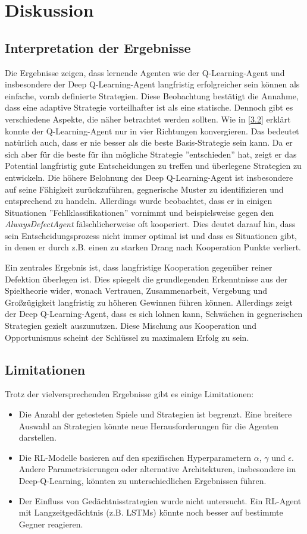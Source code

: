 \chapter{Diskussion}
\section{Interpretation der Ergebnisse}
Die Ergebnisse zeigen, dass lernende Agenten wie der Q-Learning-Agent und insbesondere der Deep Q-Learning-Agent 
langfristig erfolgreicher sein können als einfache, vorab definierte Strategien. Diese Beobachtung bestätigt die Annahme, dass 
eine adaptive Strategie vorteilhafter ist als eine statische. Dennoch gibt es verschiedene Aspekte, die näher betrachtet werden sollten.
Wie in \ref{3.2} erklärt konnte der Q-Learning-Agent nur in vier Richtungen konvergieren. Das bedeutet natürlich auch, dass er nie 
besser als die beste Basis-Strategie sein kann. Da er sich aber für die beste für ihn mögliche Strategie ''entschieden'' hat, zeigt 
er das Potential langfristig gute Entscheidungen zu treffen und überlegene Strategien zu entwickeln.
Die höhere Belohnung des Deep Q-Learning-Agent ist insbesondere auf seine Fähigkeit zurückzuführen, gegnerische Muster 
zu identifizieren und entsprechend zu handeln. Allerdings wurde beobachtet, dass er in einigen Situationen ''Fehlklassifikationen''  
vornimmt und beispielsweise gegen den \textit{AlwaysDefectAgent} fälschlicherweise oft kooperiert. Dies deutet darauf hin,  
dass sein Entscheidungsprozess nicht immer optimal ist und dass es Situationen gibt, in denen er durch z.B. einen zu starken Drang nach Kooperation 
Punkte verliert.

Ein zentrales Ergebnis ist, dass langfristige Kooperation gegenüber reiner Defektion überlegen ist. Dies spiegelt die grundlegenden 
Erkenntnisse aus der Spieltheorie wider, wonach Vertrauen, Zusammenarbeit, Vergebung und Großzügigkeit langfristig zu höheren Gewinnen führen können. 
Allerdings zeigt der Deep Q-Learning-Agent, dass es sich lohnen kann, Schwächen in gegnerischen Strategien gezielt auszunutzen. 
Diese Mischung aus Kooperation und Opportunismus scheint der Schlüssel zu maximalem Erfolg zu sein.

\section{Limitationen}
Trotz der vielversprechenden Ergebnisse gibt es einige Limitationen:
\begin{itemize}
    \item Die Anzahl der getesteten Spiele und Strategien ist begrenzt. Eine breitere Auswahl an Strategien könnte neue Herausforderungen für die Agenten darstellen.
    \item Die RL-Modelle basieren auf den spezifischen Hyperparametern $\alpha$, $\gamma$ und $\epsilon$. Andere Parametrisierungen oder alternative Architekturen, insbesondere im Deep-Q-Learning, könnten zu unterschiedlichen Ergebnissen führen.
    \item Der Einfluss von Gedächtnisstrategien wurde nicht untersucht. Ein RL-Agent mit Langzeitgedächtnis (z.B. LSTMs) könnte noch besser auf bestimmte Gegner reagieren.
\end{itemize}